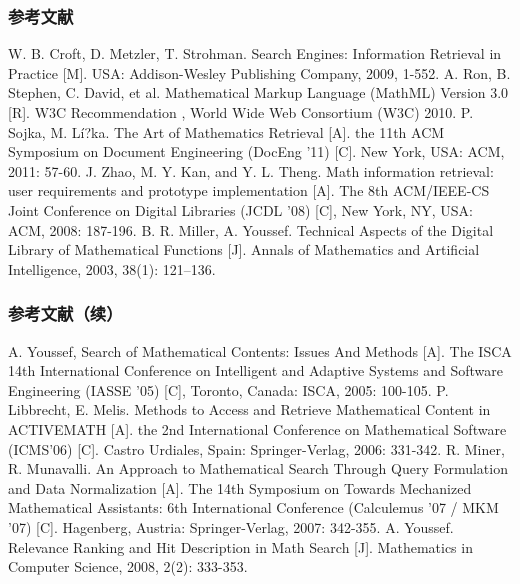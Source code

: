 \documentclass[17pt]{beamer}
\begin{document}
    \begin{frame}
        \frametitle{参考文献}
        \vspace{-1.5cm}
        \begin{thebibliography}{} %
             W. B. Croft, D. Metzler, T. Strohman. Search Engines: Information Retrieval in Practice [M]. USA: Addison-Wesley Publishing Company, 2009, 1-552.
             A. Ron, B. Stephen, C. David, et al. Mathematical Markup Language (MathML) Version 3.0 [R]. W3C Recommendation , World Wide Web Consortium (W3C) 2010.
             P. Sojka, M. Lí?ka. The Art of Mathematics Retrieval [A]. the 11th ACM Symposium on Document Engineering (DocEng '11) [C]. New York, USA: ACM, 2011: 57-60.
             J. Zhao, M. Y. Kan, and Y. L. Theng. Math information retrieval: user requirements and prototype implementation [A]. The 8th ACM/IEEE-CS Joint Conference on Digital Libraries (JCDL '08) [C], New York, NY, USA: ACM, 2008: 187-196.
             B. R. Miller, A. Youssef. Technical Aspects of the Digital Library of Mathematical Functions [J]. Annals of Mathematics and Artificial Intelligence, 2003, 38(1): 121–136.
        \end{thebibliography}
    \end{frame}

    \begin{frame}
        \frametitle{参考文献（续）}
        \vspace{-1.5cm}
        \begin{thebibliography}{}
             A. Youssef,  Search of Mathematical Contents: Issues And Methods [A]. The ISCA 14th International Conference on Intelligent and Adaptive Systems and Software Engineering (IASSE '05) [C], Toronto, Canada: ISCA, 2005: 100-105.
             P. Libbrecht, E. Melis. Methods to Access and Retrieve Mathematical Content in ACTIVEMATH [A]. the 2nd International Conference on Mathematical Software (ICMS'06) [C]. Castro Urdiales, Spain: Springer-Verlag, 2006: 331-342.
             R. Miner, R. Munavalli. An Approach to Mathematical Search Through Query Formulation and Data Normalization [A]. The 14th Symposium on Towards Mechanized Mathematical Assistants: 6th International Conference (Calculemus '07 / MKM '07) [C]. Hagenberg, Austria: Springer-Verlag, 2007: 342-355.
             A. Youssef. Relevance Ranking and Hit Description in Math Search [J]. Mathematics in Computer Science, 2008, 2(2): 333-353.
        \end{thebibliography}
    \end{frame}
\end{document}
